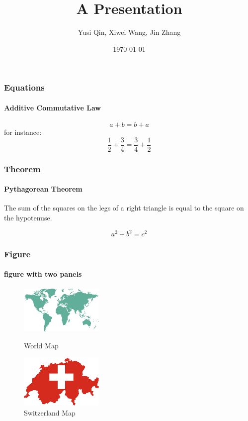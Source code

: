 \documentclass[10pt]{beamer}
\begin{document}
\author{Yusi Qin, Xiwei Wang, Jin Zhang}
\title{A Presentation}
\date{\today}

\begin{frame}
\end{frame}

\begin{frame}
\frametitle{Equations}
\framesubtitle{Additive Commutative Law}
\tableofcontents
\begin{equation}
a+b = b+a
\end{equation}
for instance:
\begin{equation}
\frac{1}{2} + \frac{3}{4} = \frac{3}{4} + \frac{1}{2}
\end{equation}
\end{frame}

\begin{frame}
\frametitle{Theorem}
\framesubtitle{Pythagorean Theorem}
\tableofcontents
\begin{theorem}
The sum of the squares on the legs of a right triangle is equal to the square on the hypotenuse.
\end{theorem}
\begin{equation*}
a^2+b^2 = c^2
\end{equation*}
\end{frame}

\begin{frame}
\frametitle{Figure}
\framesubtitle{figure with two panels}
\tableofcontents
\begin{figure}[htbp]
\centering
\begin{minipage}[t]{0.4\linewidth}
\centering
\includegraphics[width=4cm]{WorldMap.png}
\caption{World Map}
\end{minipage}
\begin{minipage}[t]{0.4\linewidth}
\centering
\includegraphics[width=4cm]{SwitzerlandMap.png}
\caption{Switzerland Map}
\end{minipage}
\end{figure}

\end{frame}
\end{document}
